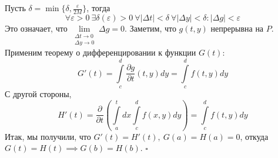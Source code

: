 Пусть $\delta=\min \{\delta,\frac{\varepsilon}{2M}\}$, тогда
$$\forall \varepsilon>0~\exists \delta(\varepsilon)>0~\forall |\Delta t|
<\delta~\forall |\Delta y|<\delta:|\Delta g|<\varepsilon$$
Это означает, что $\lim\limits_{\substack{\Delta t\to 0\\
\Delta y\to 0}}\Delta g=0$. Заметим, что $g(t,y)$ непрерывна на  $P$.
Применим теорему о дифференцировании к функции $G(t)$: 
$$G'(t)=\int\limits_{c}^{d} \frac{\partial g}{\partial t}(t,y)dy=
\int\limits_{c}^{d}f(t,y)dy$$
С другой стороны,
$$H'(t)=\frac{\partial}{\partial t}\left( \int\limits_{a}^{t}dx
\int\limits_{c}^{d}f(x,y)dy \right)=\int\limits_{c}^{d}f(t,y)dy$$
Итак, мы получили, что $G'(t)=H'(t),~G(a)=H(a)=0$, откуда
$G(t)=H(t)\implies G(b)=H(b)$. $\square$ \\












